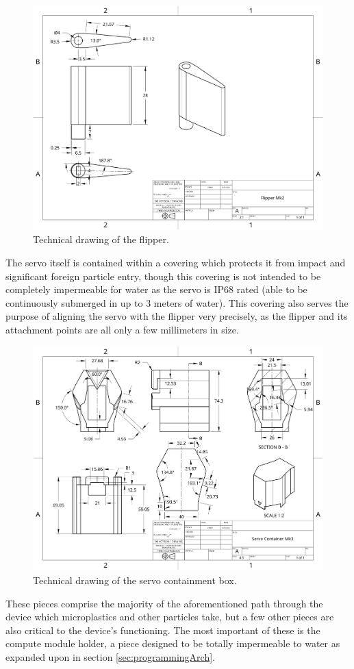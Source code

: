 \documentclass[fleqn,10pt]{SelfArx} %
\begin{document}
	\begin{figure}[h]
		\centering
		\includegraphics[width=1\linewidth]{Figures/TechFlipper}
		\caption[Flipper Tech. Drawing]{Technical drawing of the flipper.}
		\label{fig:techFlipper}
	\end{figure} 
	The servo itself is contained within a covering which protects it from impact and significant foreign particle entry, though this covering is not intended to be completely impermeable for water as the servo is IP68 rated (able to be continuously submerged in up to 3 meters of water). This covering also serves the purpose of aligning the servo with the flipper very precisely, as the flipper and its attachment points are all only a few millimeters in size. 
	\begin{figure}[h]
		\centering
		\includegraphics[width=1\linewidth]{Figures/TechServoBox}
		\caption[Servo Container Tech. Drawing]{Technical drawing of the servo containment box.}
		\label{fig:techServo}
	\end{figure} 
	These pieces comprise the majority of the aforementioned path through the device which microplastics and other particles take, but a few other pieces are also critical to the device’s functioning. The most important of these is the compute module holder, a piece designed to be totally impermeable to water as expanded upon in section \ref{sec:programmingArch}. 
	
\end{document}
